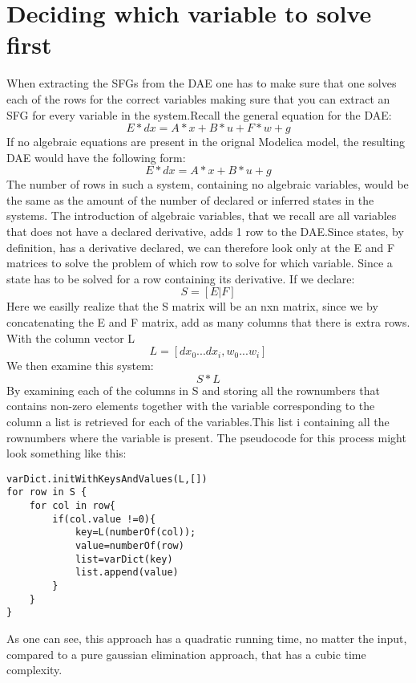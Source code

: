 
\section{Deciding which variable to solve first}
When extracting the SFGs from the DAE one has to make sure that one solves each of the rows for the correct variables making sure that you can extract an SFG for every variable in the system.Recall the general equation for the DAE:
\begin{equation}
E*dx = A*x + B*u + F*w + g
\end{equation}
If no algebraic equations are present in the orignal Modelica model, the resulting DAE would have the following form:
\begin{equation}
E*dx = A*x + B*u + g
\end{equation}
The number of rows in such a system, containing no algebraic variables, would be the same as the amount of the number of declared or inferred states in the systems. The introduction of algebraic variables, that we recall are all variables that does not have a declared derivative, adds 1 row to the DAE.Since states, by definition, has a derivative declared, we can therefore look only at the E and F matrices to solve the problem of which row to solve for which variable. Since a state has to be solved for a row containing its derivative. If we declare:
\begin{equation}
S=[E|F]
\end{equation}
Here we easilly realize that the S matrix will be an nxn matrix, since we by concatenating the E and F matrix, add as many columns that there is extra rows.\\
With the column vector L
\begin{equation}
L=[dx_0...dx_i, w_0...w_i]
\end{equation}
We then examine this system:
\begin{equation}
S*L
\end{equation}
By examining each of the columns in S and storing all the rownumbers that contains non-zero elements together with the variable corresponding to the column a list is retrieved for each of the variables.This  list i containing all the rownumbers where the variable is present.
The pseudocode for this process might look something like this:

\begin{lstlisting}
varDict.initWithKeysAndValues(L,[])
for row in S {
	for col in row{
		if(col.value !=0){
			key=L(numberOf(col));
			value=numberOf(row)
			list=varDict(key)
			list.append(value)		
		}
	}			
}
\end{lstlisting}
As one can see, this approach has a quadratic running time, no matter the input, compared to a pure gaussian elimination approach, that has a cubic time complexity.

